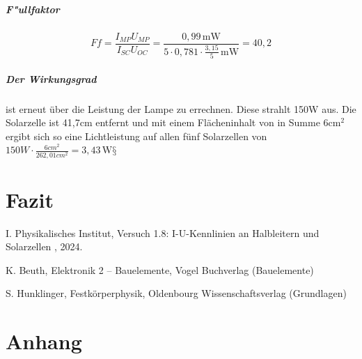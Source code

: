 \documentclass[12pt,a4paper,ngerman]{report}
\begin{document}
		\paragraph{F"ullfaktor}
		
		$$    Ff=\frac{I_{MP}U_{MP}}{I_{SC}U_{OC}}=\frac{0,99\, \text{mW}}{5\cdot0,781\cdot\frac{3,15}{5}\,\text{mW}}=40,2 $$
		
		\paragraph{Der Wirkungsgrad} ist erneut über die Leistung der Lampe zu errechnen. Diese strahlt 150W aus. Die Solarzelle ist 41,7cm entfernt und mit einem Flächeninhalt von in Summe 6cm$^2$ ergibt sich so eine Lichtleistung auf allen fünf Solarzellen von $150W\cdot\frac{6cm^2}{262,01cm^2}=3,43\,\text{W}§ $
		
		

		


		
		



\chapter{Fazit}

	\listoffigures
	
	\begin{thebibliography}{111} 
		I. Physikalisches Institut, \glqq Versuch 1.8: I-U-Kennlinien an Halbleitern
		und Solarzellen \grqq{}, 2024.
		
		K. Beuth, \glqq Elektronik 2 – Bauelemente\grqq, Vogel Buchverlag (Bauelemente)
		
		S. Hunklinger, \glqq Festkörperphysik\grqq, Oldenbourg Wissenschaftsverlag (Grundlagen)
		
		
		
	\end{thebibliography}


\chapter*{Anhang} \label{ch:Anhang}
\FloatBarrier
\end{document}
